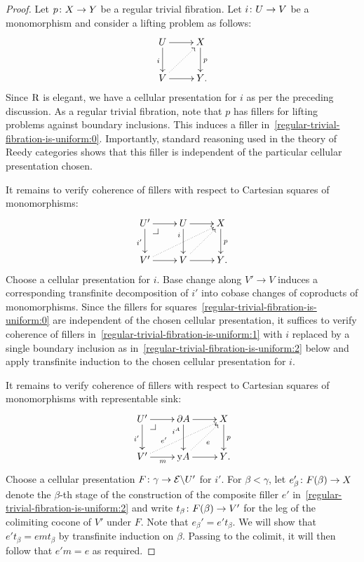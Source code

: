 \documentclass[reqno,10pt,a4paper,oneside]{amsart}
\begin{document}
\begin{proof} Let $p \colon X \to Y$ be a regular trivial fibration.
Let $i \colon U \to V$ be a monomorphism and consider a lifting problem as follows:
\begin{equation} \label{regular-trivial-fibration-is-uniform:0}
\xycenter{
  U
  \ar[d]_{i}
  \ar[r]
&
  X
  \ar[d]^{p}
\\
  V
  \ar[r]
  \ar@{.>}[ur]
&
  Y
\rlap{.}
}
\end{equation}
Since $\mathrm{R}$ is elegant, we have a cellular presentation for $i$ as per the preceding discussion.
As a regular trivial fibration, note that $p$ has fillers for lifting problems against boundary inclusions.
This induces a filler in~\eqref{regular-trivial-fibration-is-uniform:0}.
Importantly, standard reasoning used in the theory of Reedy categories shows that this filler is independent of the particular cellular presentation chosen.

It remains to verify coherence of fillers with respect to Cartesian squares of monomorphisms:
\begin{equation} \label{regular-trivial-fibration-is-uniform:1}
\xycenter{
  U'
  \ar[d]_{i'}
  \ar[r]
  \pullback{dr}
&
  U
  \ar[d]_(0.3){i}
  \ar[r]
&
  X
  \ar[d]^{p}
\\
  V'
  \ar[r]
  \ar@{.>}[urr]
&
  V
  \ar[r]
  \ar@{.>}[ur]
&
  Y
\rlap{.}}
\end{equation}
Choose a cellular presentation for $i$.
Base change along $V' \to V$ induces a corresponding transfinite decomposition of $i'$ into cobase changes of coproducts of monomorphisms.
Since the fillers for squares~\eqref{regular-trivial-fibration-is-uniform:0} are independent of the chosen cellular presentation, it suffices to verify coherence of fillers in~\eqref{regular-trivial-fibration-is-uniform:1} with $i$ replaced by a single boundary inclusion as in~\eqref{regular-trivial-fibration-is-uniform:2} below and apply transfinite induction to the chosen cellular presentation for $i$.

It remains to verify coherence of fillers with respect to Cartesian squares of monomorphisms with representable sink:
\begin{equation} \label{regular-trivial-fibration-is-uniform:2}
\xycenter{
  U'
  \ar[d]_{i'}
  \ar[r]
  \pullback{dr}
&
  \partial A
  \ar[d]_(0.3){i^A}
  \ar[r]
&
  X
  \ar[d]^{p}
\\
  V'
  \ar[r]_{m}
  \ar@{.>}[urr]^(0.3){e'}
&
  \yon A
  \ar[r]
  \ar@{.>}[ur]_{e}
&
  Y
\rlap{.}}
\end{equation}
Choose a cellular presentation $F \colon \gamma \to \mathcal{E} \backslash U'$ for $i'$.
For $\beta < \gamma$, let $e_{\beta}' \colon F(\beta) \to X$ denote the $\beta$-th stage of the construction of the composite filler $e'$ in~\eqref{regular-trivial-fibration-is-uniform:2} and write $t_{\beta} \colon F(\beta) \to V'$ for the leg of the colimiting cocone of $V'$ under $F$.
Note that $e_{\beta}' = e' t_{\beta}$.
We will show that $e' t_{\beta} = e m t_{\beta}$ by transfinite induction on $\beta$.
Passing to the colimit, it will then follow that $e' m = e$ as required.


\end{proof}
\end{document}

